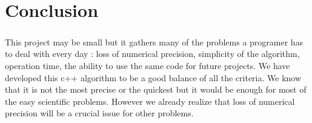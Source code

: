 \documentclass[a4paper, twoside, 11pt]{report}
\theoremstyle{theorem}
\theoremstyle{remark}
\theoremstyle{exemple}
\begin{document}
		\chapter*{Conclusion}	
		
		\paragraph{} This project may be small but it gathers many of the problems a programer has to deal with every day : loss of numerical precision, simplicity of the algorithm, operation time, the ability to use the same code for future projects. We have developed this c++ algorithm to be a good balance of all the criteria. We know that it is not the most precise or the quickest  but it would be enough for most of the easy scientific problems. However we already realize that loss of numerical precision will be a crucial issue for other problems.
		
	
				
\end{document}
